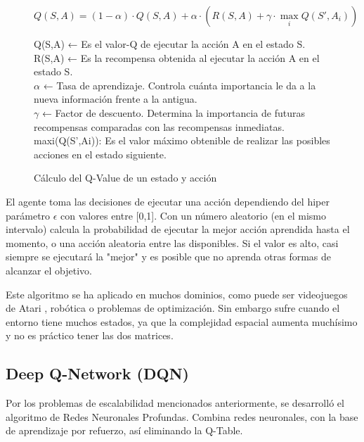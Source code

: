 		\begin{figure}[!h]				
		\begin{flushleft}
		\begin{mdframed}[roundcorner=5pt]
			\[
			Q(S,A) = (1-\alpha) \cdot Q(S,A) + \alpha \cdot \left(R(S,A) + \gamma \cdot \max_{i} Q(S',A_i)\right)
			\]
			\begin{tcolorbox}[boxrule=0.5pt, fontupper=\small]
				\scriptsize
				Q(S,A) ← Es el valor-Q de ejecutar la acción A en el estado S.\\
				R(S,A) ← Es la recompensa obtenida al ejecutar la acción A en el estado S.\\
				$\alpha$ ← Tasa de aprendizaje. Controla cuánta importancia le da a la nueva información frente a la antigua.\\
				$\gamma$ ← Factor de descuento. Determina la importancia de futuras recompensas comparadas con las recompensas inmediatas.\\
				maxi(Q(S’,Ai)): Es el valor máximo obtenible de realizar las posibles acciones en el estado siguiente.
				
					
			\end{tcolorbox}
	
		
		\end{mdframed}		
		\end{flushleft}
		\caption{Cálculo del Q-Value de un estado y acción}	
		\label{fig:qvalue}
		\end{figure}
		
		
		El agente toma las decisiones de ejecutar una acción dependiendo del hiper parámetro $\epsilon$  con valores entre [0,1]. Con un número aleatorio (en el mismo intervalo) calcula la probabilidad de ejecutar la mejor acción aprendida hasta el momento, o una acción aleatoria entre las disponibles. Si el valor es alto, casi siempre se ejecutará la "mejor" y es posible que no aprenda otras formas de alcanzar el objetivo.
		
		
		Este algoritmo se ha aplicado en muchos dominios, como puede ser videojuegos de Atari \cite{mnih2013playing}, robótica o problemas de optimización. Sin embargo sufre cuando el entorno tiene muchos estados, ya que la complejidad espacial aumenta muchísimo y no es práctico tener las dos matrices.\\
		
	\subsection{Deep Q-Network (DQN)}
		Por los problemas de escalabilidad mencionados anteriormente, se desarrolló el algoritmo de Redes Neuronales Profundas. Combina redes neuronales, con la base de aprendizaje por refuerzo, así eliminando la Q-Table.
		
